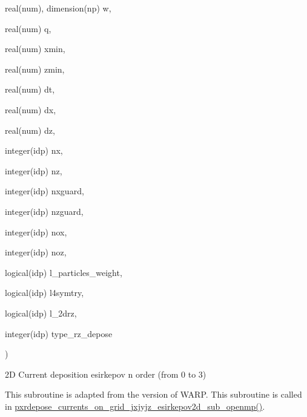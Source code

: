 {\begin{DoxyParamCaption}
\item[{real(num), dimension(np)}]{w, }
\item[{real(num)}]{q, }
\item[{real(num)}]{xmin, }
\item[{real(num)}]{zmin, }
\item[{real(num)}]{dt, }
\item[{real(num)}]{dx, }
\item[{real(num)}]{dz, }
\item[{integer(idp)}]{nx, }
\item[{integer(idp)}]{nz, }
\item[{integer(idp)}]{nxguard, }
\item[{integer(idp)}]{nzguard, }
\item[{integer(idp)}]{nox, }
\item[{integer(idp)}]{noz, }
\item[{logical(idp)}]{l\+\_\+particles\+\_\+weight, }
\item[{logical(idp)}]{l4symtry, }
\item[{logical(idp)}]{l\+\_\+2drz, }
\item[{integer(idp)}]{type\+\_\+rz\+\_\+depose}
\end{DoxyParamCaption}
)}\hypertarget{current__deposition__2d_8_f90_a8b3dd693be6a41b342722e15aa4880de}{}\label{current__deposition__2d_8_f90_a8b3dd693be6a41b342722e15aa4880de}


2D Current deposition esirkepov n order (from 0 to 3) 

This subroutine is adapted from the version of W\+A\+RP. This subroutine is called in \hyperlink{current__deposition__2d_8_f90_a7384ad64cf4beca09ab1a45d8c323395}{pxrdepose\+\_\+currents\+\_\+on\+\_\+grid\+\_\+jxjyjz\+\_\+esirkepov2d\+\_\+sub\+\_\+openmp()}. 

